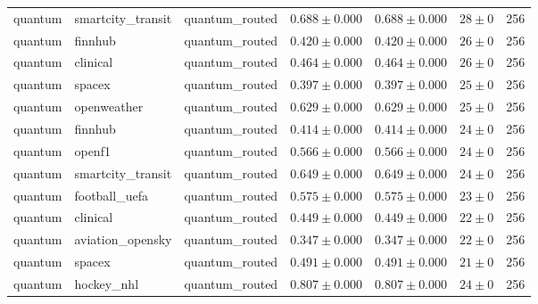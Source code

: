 \begin{table}[htbp]
\begin{tabular}{l l l r r r r}
quantum & smartcity\_transit & quantum\_routed & $0.688\pm0.000$ & $0.688\pm0.000$ & $28\pm0$ & 256 \\
quantum & finnhub & quantum\_routed & $0.420\pm0.000$ & $0.420\pm0.000$ & $26\pm0$ & 256 \\
quantum & clinical & quantum\_routed & $0.464\pm0.000$ & $0.464\pm0.000$ & $26\pm0$ & 256 \\
quantum & spacex & quantum\_routed & $0.397\pm0.000$ & $0.397\pm0.000$ & $25\pm0$ & 256 \\
quantum & openweather & quantum\_routed & $0.629\pm0.000$ & $0.629\pm0.000$ & $25\pm0$ & 256 \\
quantum & finnhub & quantum\_routed & $0.414\pm0.000$ & $0.414\pm0.000$ & $24\pm0$ & 256 \\
quantum & openf1 & quantum\_routed & $0.566\pm0.000$ & $0.566\pm0.000$ & $24\pm0$ & 256 \\
quantum & smartcity\_transit & quantum\_routed & $0.649\pm0.000$ & $0.649\pm0.000$ & $24\pm0$ & 256 \\
quantum & football\_uefa & quantum\_routed & $0.575\pm0.000$ & $0.575\pm0.000$ & $23\pm0$ & 256 \\
quantum & clinical & quantum\_routed & $0.449\pm0.000$ & $0.449\pm0.000$ & $22\pm0$ & 256 \\
quantum & aviation\_opensky & quantum\_routed & $0.347\pm0.000$ & $0.347\pm0.000$ & $22\pm0$ & 256 \\
quantum & spacex & quantum\_routed & $0.491\pm0.000$ & $0.491\pm0.000$ & $21\pm0$ & 256 \\
quantum & hockey\_nhl & quantum\_routed & $0.807\pm0.000$ & $0.807\pm0.000$ & $24\pm0$ & 256 \\
\hline
\end{tabular}
\end{table}
